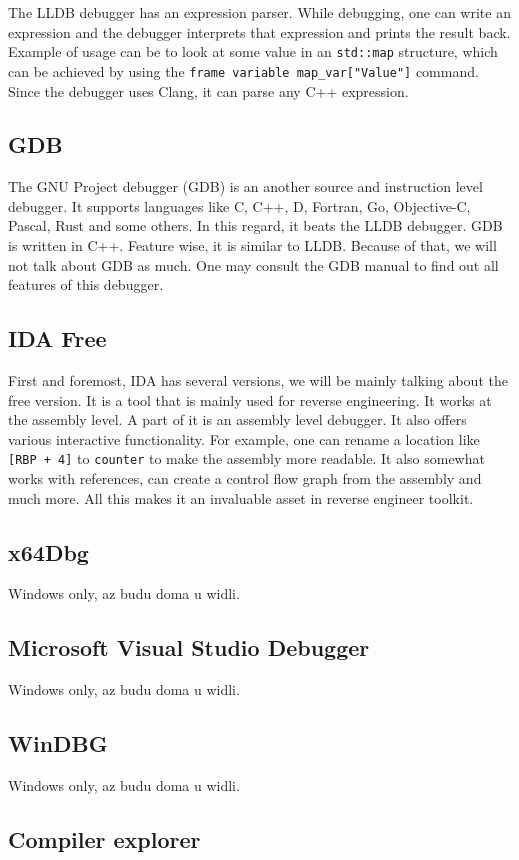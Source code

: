 The LLDB debugger has an expression parser. While debugging, one can write an
expression and the debugger interprets that expression and prints the result
back. Example of usage can be to look at some value in an \texttt{std::map}
structure, which can be achieved by using the \texttt{frame variable
map\_var["Value"]} command. Since the debugger uses Clang, it can parse
any C++ expression.

\subsection{GDB}
The GNU Project debugger (GDB) is an another source and instruction level
debugger. It supports languages like C, C++, D, Fortran, Go, Objective-C,
Pascal, Rust and some others. In this regard, it beats the LLDB debugger. GDB
is written in C++. Feature wise, it is similar to LLDB. Because of that, we
will not talk about GDB as much. One may consult the GDB manual
\cite{gdb-manual} to find out all features of this debugger.

\subsection{IDA Free}
First and foremost, IDA has several versions, we will be mainly talking about
the free version. It is a tool that is mainly used for reverse engineering. It
works at the assembly level. A part of it is an assembly level debugger. It
also offers various interactive functionality. For example, one can rename a
location like \texttt{[RBP + 4]} to \texttt{counter} to make the assembly more
readable. It also somewhat works with references, can create a control flow
graph from the assembly and much more. All this makes it an invaluable asset in
reverse engineer toolkit.

\subsection{x64Dbg}
Windows only, az budu doma u widli.

\subsection{Microsoft Visual Studio Debugger}
Windows only, az budu doma u widli.

\subsection{WinDBG}
Windows only, az budu doma u widli.

\subsection{Compiler explorer}
